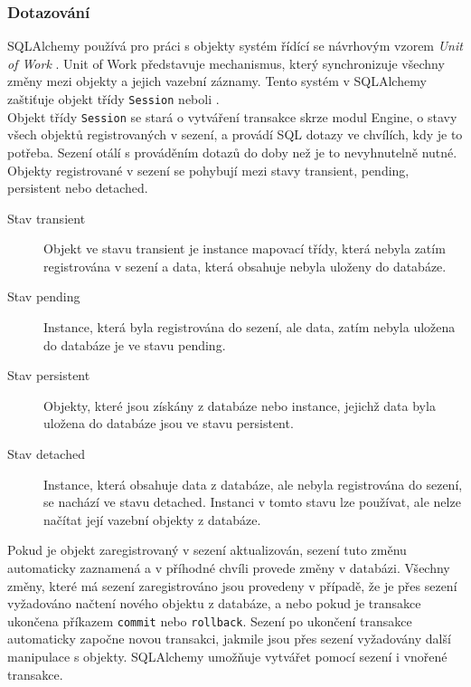 \documentclass[ing,male,java,dept456]{diploma}						%
\begin{document}
\subsubsection{Dotazování}

SQLAlchemy používá pro práci s objekty systém řídící se návrhovým vzorem \textit{Unit of Work} \cite{fowler}. Unit of Work představuje mechanismus, který synchronizuje všechny změny mezi objekty a jejich vazební záznamy. Tento systém v SQLAlchemy zaštiťuje objekt třídy \lstinline[style=inlinepython]|Session| neboli . \\
Objekt třídy \lstinline[style=inlinepython]|Session| se stará o vytváření transakce skrze modul Engine, o stavy všech objektů registrovaných v sezení, a provádí SQL dotazy ve chvílích, kdy je to potřeba. Sezení otálí s prováděním dotazů do doby než je to nevyhnutelně nutné. Objekty registrované v sezení se pohybují mezi stavy transient, pending, persistent nebo detached.

\begin{description}
\item[Stav transient] Objekt ve stavu transient je instance mapovací třídy, která nebyla zatím registrována v sezení a data, která obsahuje nebyla uloženy do databáze. 
\item[Stav pending] Instance, která byla registrována do sezení, ale data, zatím nebyla uložena do databáze je ve stavu pending.
\item[Stav persistent] Objekty, které jsou získány z databáze nebo instance, jejichž data byla uložena do databáze jsou ve stavu persistent.
\item[Stav detached] Instance, která obsahuje data z databáze, ale nebyla registrována do sezení, se nachází ve stavu detached. Instanci v tomto stavu lze používat, ale nelze načítat její vazební objekty z databáze.
\end{description}

Pokud je objekt zaregistrovaný v sezení aktualizován, sezení tuto změnu automaticky zaznamená a v příhodné chvíli provede změny v databázi. Všechny změny, které má sezení zaregistrováno jsou provedeny v případě, že je přes sezení vyžadováno načtení nového objektu z databáze, a nebo pokud je transakce ukončena příkazem \lstinline[style=inlinepython]|commit| nebo \lstinline[style=inlinepython]|rollback|. Sezení po ukončení transakce automaticky započne novou transakci, jakmile jsou přes sezení vyžadovány další manipulace s objekty. SQLAlchemy umožňuje vytvářet pomocí sezení i vnořené transakce. \\
\end{document}

